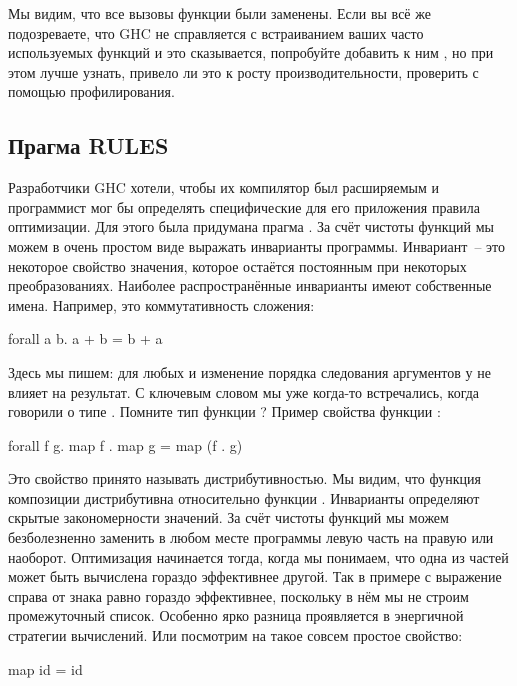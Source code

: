 Мы видим, что все вызовы функции  были заменены. 
Если вы всё же подозреваете, что GHC не справляется 
с встраиванием ваших часто используемых функций
и это сказывается, попробуйте добавить
к ним , но при этом лучше узнать, привело
ли это к росту производительности, проверить 
с помощью профилирования.


\subsection{Прагма RULES}

Разработчики GHC хотели, чтобы их компилятор был расширяемым
и программист мог бы определять специфические для его приложения
правила оптимизации. Для этого была придумана прагма .
За счёт чистоты функций мы можем в очень простом виде выражать 
инварианты программы. Инвариант~-- это некоторое свойство значения,
которое остаётся постоянным при некоторых преобразованиях.
Наиболее распространённые инварианты имеют собственные
имена. Например, это коммутативность сложения:

\begin{code}
forall a b. a + b = b + a
\end{code}

Здесь мы пишем: для любых  и  изменение порядка
следования аргументов у \In{(+)} не влияет на результат. 
С ключевым словом  мы уже когда-то встречались,
когда говорили о типе . Помните тип функции ?
Пример свойства функции :

\begin{code}
forall f g.   map f . map g = map (f . g)
\end{code}

Это свойство принято называть дистрибутивностью. Мы видим,
что функция композиции дистрибутивна относительно функции .
Инварианты определяют скрытые закономерности значений. 
За счёт чистоты функций мы можем безболезненно заменить
в любом месте программы левую часть на правую или наоборот.
Оптимизация начинается тогда, когда мы понимаем, что 
одна из частей может быть вычислена гораздо эффективнее
другой. Так в примере с  выражение справа от
знака равно гораздо эффективнее, поскольку в нём мы 
не строим промежуточный список. Особенно ярко разница
проявляется в энергичной стратегии вычислений. 
Или посмотрим на такое совсем простое свойство:

\begin{code}
map id = id
\end{code}
  
